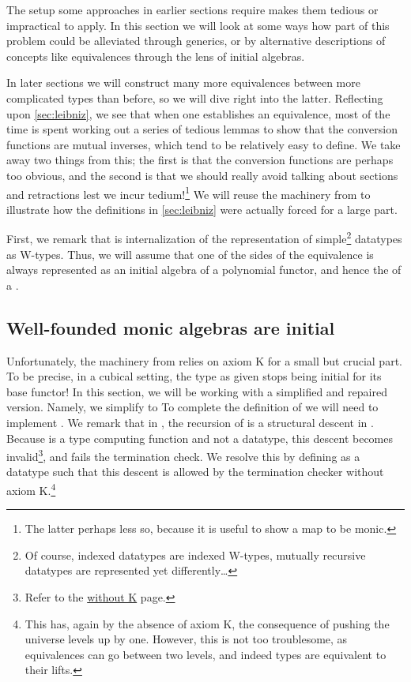 The setup some approaches in earlier sections require makes them tedious or impractical to apply. In this section we will look at some ways how part of this problem could be alleviated through generics, or by alternative descriptions of concepts like equivalences through the lens of initial algebras. 

In later sections we will construct many more equivalences between more complicated types than before, so we will dive right into the latter. Reflecting upon \autoref{sec:leibniz}, we see that when one establishes an equivalence, most of the time is spent working out a series of tedious lemmas to show that the conversion functions are mutual inverses, which tend to be relatively easy to define. We take away two things from this; the first is that the conversion functions are perhaps too obvious, and the second is that we should really avoid talking about sections and retractions lest we incur tedium!\footnote{The latter perhaps less so, because it is useful to show a map to be monic.} We will reuse the machinery from \cite{progorn} to illustrate how the definitions in \autoref{sec:leibniz} were actually forced for a large part.

First, we remark that  is internalization of the representation of simple\footnote{Of course, indexed datatypes are indexed W-types, mutually recursive datatypes are represented yet differently\dots} datatypes as W-types. Thus, we will assume that one of the sides of the equivalence is always represented as an initial algebra of a polynomial functor, and hence the  of a .

\subsection{Well-founded monic algebras are initial}\label{ssec:wellfounded}
Unfortunately, the machinery from \cite{progorn} relies on axiom K for a small but crucial part. To be precise, in a cubical setting, the type  as given stops being initial for its base functor! In this section, we will be working with a simplified and repaired version. Namely, we simplify  to 
To complete the definition of 
we will need to implement . We remark that in \cite{progorn}, the recursion of  is a structural descent in . Because  is a type computing function and not a datatype, this descent becomes invalid\footnote{Refer to the  \href{https://agda.readthedocs.io/en/latest/language/without-k.html\#restrictions-on-termination-checking}{without K} page.}, and  fails the termination check. We resolve this by defining  as a datatype
such that this descent is allowed by the termination checker without axiom K.\footnote{This has, again by the absence of axiom K, the consequence of pushing the universe levels up by one. However, this is not too troublesome, as equivalences can go between two levels, and indeed types are equivalent to their lifts.}


